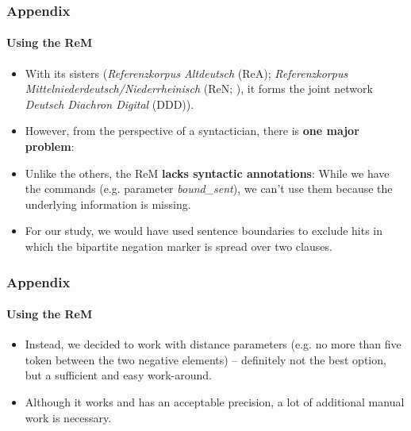 \documentclass[xcolor=table, compress, %
handout
]{beamer}
\begin{document}
\begin{frame}
\frametitle{Appendix}
\framesubtitle{Using the ReM}
    
\begin{itemize}
    \item With its sisters (\textit{Referenzkorpus Altdeutsch} (ReA); \textit{Referenzkorpus Mittelniederdeutsch/Niederrheinisch} (ReN; \citealt{ReNTeam2019}), it forms the joint network \textit{Deutsch Diachron Digital} (DDD)).
    \item However, from the perspective of a syntactician, there is \textbf{one major problem}:
    \item Unlike the others, the ReM \textbf{lacks syntactic annotations}: While we have the commands (e.g. parameter \textit{bound\_sent}), we can't use them because the underlying information is missing.
    \item For our study, we would have used sentence boundaries to exclude hits in which the bipartite negation marker is spread over two clauses.
\end{itemize}
    
\end{frame}

\begin{frame}
\frametitle{Appendix}
\framesubtitle{Using the ReM}
    
    \begin{itemize}
    \item Instead, we decided to work with distance parameters (e.g. no more than five token between the two negative elements) – definitely not the best option, but a sufficient and easy work-around.
    \item Although it works and has an acceptable precision, a lot of additional manual work is necessary.
    \end{itemize}
    
\end{frame}
\end{document}
